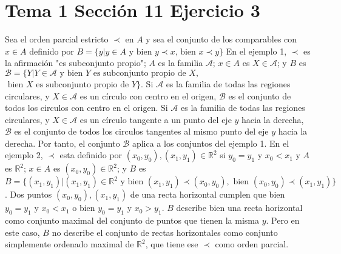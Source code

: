 \documentclass{article}
\begin{document}
\section{Tema 1 Sección 11 Ejercicio 3}
Sea el orden parcial estricto $\prec$ en $A$ y sea el conjunto de los comparables con $x\in A$ definido por $B=\{y|y\in A \text{ y bien }y\prec x \text{, bien }x\prec y \}$
En el ejemplo 1, $\prec$ es la afirmación "es subconjunto propio"; $A$ es la familia $\mathcal{A}$; $x\in A$ es $X\in \mathcal{A}$; y $B$ es $\mathcal{B}=\{Y|Y\in \mathcal{A} \text{ y bien }Y\text{ es subconjunto propio de  }X,$ 
$\text{ bien }X\text{ es subconjunto propio de }Y\}$. Si $\mathcal{A}$ es la familia de todas las regiones circulares, y $X\in \mathcal{A}$ es un círculo con centro en el origen, $\mathcal{B}$ es el conjunto de todos los circulos con centro en el origen. Si $\mathcal{A}$ es la familia de todas las regiones circulares, y $X\in \mathcal{A}$ es un círculo tangente a un punto del eje $y$ hacia la derecha, $\mathcal{B}$ es el conjunto de todos los circulos tangentes al mismo punto del eje $y$ hacia la derecha. Por tanto, el conjunto $\mathcal{B}$ aplica a los conjuntos del ejemplo 1.
En el ejemplo 2, $\prec$ esta definido por $(x_0,y_0),(x_1,y_1)\in \mathbb{R}^2$ si $y_0=y_1$ y $x_0<x_1$ y $A$ es $\mathbb{R}^2$; $x\in A$ es $(x_0,y_0)\in \mathbb{R}^2$; y $B$ es $B=\{(x_1,y_1)|(x_1,y_1)\in \mathbb{R}^2 \text{ y bien }(x_1,y_1)\prec (x_0,y_0), \text{ bien }(x_0,y_0)\prec (x_1,y_1)\}$. Dos puntos $(x_0,y_0),(x_1,y_1)$ de una recta horizontal cumplen que bien $y_0=y_1$ y $x_0<x_1$ o bien $y_0=y_1$ y $x_0>y_1$. $B$ describe bien una recta horizontal como conjunto maximal del conjunto de puntos que tienen la misma $y$. Pero en este caso, $B$ no describe el conjunto de rectas horizontales como conjunto simplemente ordenado maximal de $\mathbb{R}^2$, que tiene ese $\prec$ como orden parcial.
\end{document}
